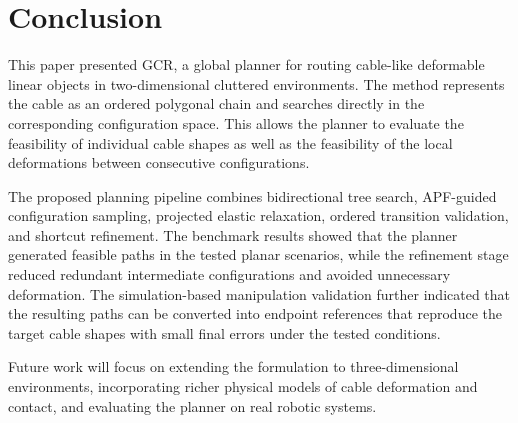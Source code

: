 \documentclass{pas}
\begin{document}
\section{Conclusion}
\label{sec:conclusion}

This paper presented GCR, a global planner for routing cable-like deformable
linear objects in two-dimensional cluttered environments. The method represents
the cable as an ordered polygonal chain and searches directly in the corresponding
configuration space. This allows the planner to evaluate the feasibility of individual cable
shapes as well as the feasibility of the local deformations between
consecutive configurations.

The proposed planning pipeline combines bidirectional tree search, APF-guided
configuration sampling, projected elastic relaxation, ordered transition
validation, and shortcut refinement. The benchmark results showed that the
planner generated feasible paths in the tested planar scenarios, while the
refinement stage reduced redundant intermediate configurations and avoided
unnecessary deformation. The simulation-based manipulation validation further indicated that the resulting paths can be converted into endpoint references that reproduce the target cable shapes with small final errors under the tested conditions.

Future work will focus on extending the formulation to three-dimensional
environments, incorporating richer physical models of cable deformation and
contact, and evaluating the planner on real robotic systems.







\end{document}
